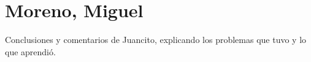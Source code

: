 \section{Moreno, Miguel}
Conclusiones y comentarios de Juancito, explicando los problemas que tuvo y lo que aprendió.